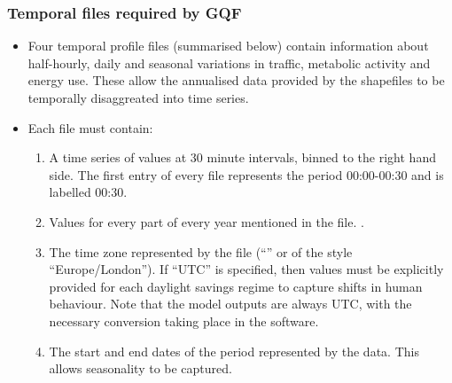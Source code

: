 \documentclass[letterpaper,10pt,english]{sphinxmanual}
\begin{document}
\subsubsection{Temporal files required by GQF}
\label{\detokenize{OtherManuals/GQF_Manual:temporal-files-required-by-gqf}}
\begin{itemize}
\item {} 
Four temporal profile files (summarised below) contain information
about half-hourly, daily and seasonal variations in traffic,
metabolic activity and energy use. These allow the annualised data
provided by the shapefiles to be temporally disaggreated into time
series.

\item {} 
Each file must contain:
\begin{enumerate}
\item {} 
A time series of values at 30 minute intervals, binned to the
right hand side. The first entry of every file represents the
period 00:00-00:30 and is labelled 00:30.

\item {} 
Values for every part of every year mentioned in the file. .

\item {} 
The time zone represented by the file
(“”
or of the style “Europe/London”). If “UTC” is specified, then
values must be explicitly provided for each daylight savings
regime to capture shifts in human behaviour. Note that the model
outputs are always UTC, with the necessary conversion taking place
in the software.

\item {} 
The start and end dates of the period represented by the data.
This allows seasonality to be captured.

\end{enumerate}

\end{itemize}
\end{document}
